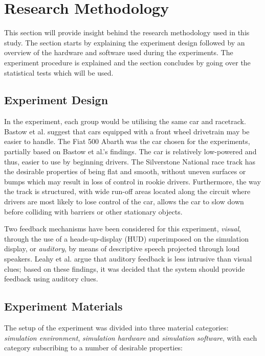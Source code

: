 \documentclass{sig-alternate}
\begin{document}
{\section{Research Methodology}
\label{sec:Methodology}

This section will provide insight behind the research methodology used in this study. The section starts by explaining the experiment design followed by an overview of the hardware and software used during the experiments. The experiment procedure is explained and the section concludes by going over the statistical tests which will be used.

\subsection{Experiment Design}
In the experiment, each group would be utilising the same car and racetrack. Bastow et al. \cite{bastow2004car} suggest that cars equipped with a front wheel drivetrain may be easier to handle. The Fiat 500 Abarth was the car chosen for the experiments, partially based on Bastow et al.'s findings. The car is relatively low-powered and thus, easier to use by beginning drivers. The Silverstone National race track has the desirable properties of being flat and smooth, without uneven surfaces or bumps which may result in loss of control in rookie drivers. Furthermore, the way the track is structured, with wide run-off areas located along the circuit where drivers are most likely to lose control of the car, allows the car to slow down before colliding with barriers or other stationary objects.

Two feedback mechanisms have been considered for this experiment, \emph{visual}, through the use of a heads-up-display (HUD) superimposed on the simulation display, or \emph{auditory}, by means of descriptive speech projected through loud speakers. Leahy et al. \cite{leahy2003auditory} argue that auditory feedback is less intrusive than visual clues; based on these findings, it was decided that the system should provide feedback using auditory clues.

\subsection{Experiment Materials}
The setup of the experiment was divided into three material categories: \emph{simulation environment}, \emph{simulation hardware} and \emph{simulation software}, with each category subscribing to a number of desirable properties:

}
\end{document}
